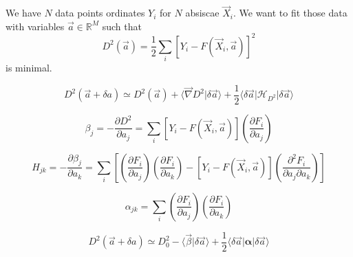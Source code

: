\documentclass[aps,12pt]{revtex4}
\begin{document}
We have $N$ data points ordinates $Y_i$ for $N$ absiscae $\vec X_i$.
We want to fit those data with variables $\vec a \in \mathbb R^M$
such that
\begin{equation}
	D^2(\vec a) = \dfrac{1}{2} \sum_i \left[ Y_i - F(\vec X_i,\vec a) \right]^2 
\end{equation}
is minimal.

\begin{equation}
	D^2(\vec a + \delta a) \simeq D^2(\vec a) + \langle \vec \nabla D^2 \vert \delta \vec a \rangle
	 + \dfrac{1}{2} \langle \delta \vec a \vert \mathcal H_{D^2} \vert \delta \vec a\rangle
\end{equation}
	
\begin{equation}
	\beta_j = - \dfrac{\partial D^2}{\partial a_j} = \sum_i \left[ Y_i - F(\vec X_i,\vec a) \right] \left( \dfrac{\partial F_i}{\partial a_j} \right)
\end{equation}

\begin{equation}
	H_{jk} = - \dfrac{\partial \beta_j}{\partial a_k} = 
	\sum_i \left[ \left( \dfrac{\partial F_i}{\partial a_j} \right) \left( \dfrac{\partial F_i}{\partial a_k} \right) - \left[ Y_i - F(\vec X_i,\vec a) \right] \left( \dfrac{\partial^2 F_i}{\partial a_j\partial a_k} \right) \right]
\end{equation}

\begin{equation}
	\alpha_{jk} = \sum_i \left( \dfrac{\partial F_i}{\partial a_j} \right) \left( \dfrac{\partial F_i}{\partial a_k} \right)
\end{equation}

\begin{equation}
	D^2(\vec a + \delta a) \simeq D^2_0 - \langle \vec \beta \vert \delta \vec a \rangle + \dfrac{1}{2}  \langle \delta \vec a \vert \bm{\alpha} \vert \delta \vec a\rangle
\end{equation}
\end{document}
